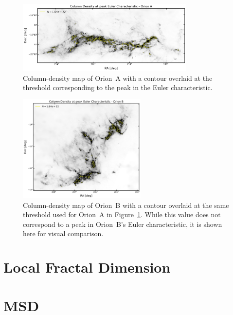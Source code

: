 \begin{figure}[h]
    \centering
    \includegraphics[width=0.79\textwidth]{figures/Euler_Orion_A_gallery.png}
    \caption{Column-density map of Orion~A with a contour overlaid at the threshold corresponding to the peak in the Euler characteristic.}
    \label{fig:gallery_euler_OA}
\end{figure}

\begin{figure}[h]
    \centering
    \includegraphics[width=0.57\textwidth]{figures/Euler_Orion_B_gallery.png}
    \caption{Column-density map of Orion~B with a contour overlaid at the same threshold used for Orion~A in Figure~\ref{fig:gallery_euler_OA}. While this value does not correspond to a peak in Orion~B’s Euler characteristic, it is shown here for visual comparison.}
    \label{fig:gallery_euler_OB}
\end{figure}

\clearpage

\section{Local Fractal Dimension}

\clearpage

\section{MSD}

